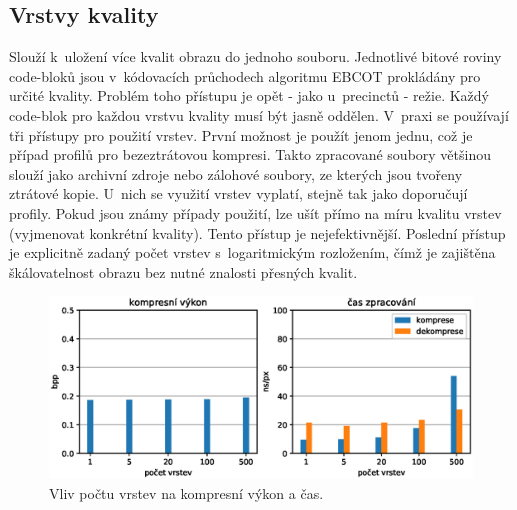\clearpage




%
%
\newpage
\subsection*{Vrstvy kvality}
Slouží k~uložení více kvalit obrazu do jednoho souboru. Jednotlivé bitové roviny code-bloků jsou v~kódovacích průchodech algoritmu EBCOT prokládány pro určité kvality. Problém toho přístupu je opět - jako u~precinctů - režie. Každý code-blok pro každou vrstvu kvality musí být jasně oddělen. V~praxi se používají tři přístupy pro použití vrstev. První možnost je použít jenom jednu, což je případ profilů pro bezeztrátovou kompresi. Takto zpracované soubory většinou slouží jako archivní zdroje nebo zálohové soubory, ze kterých jsou tvořeny ztrátové kopie. U~nich se využití vrstev vyplatí, stejně tak jako doporučují profily. Pokud jsou známy případy použití, lze ušít přímo na míru kvalitu vrstev (vyjmenovat konkrétní kvality). Tento přístup je nejefektivnější. Poslední přístup je explicitně zadaný počet vrstev s~logaritmickým rozložením, čímž je zajištěna škálovatelnost obrazu bez nutné znalosti přesných kvalit.

\begin{figure}[hbt!]
  \centering
  \hspace*{-0.75cm}
  \includegraphics[width=16cm]{obrazky-figures/layers/fotky_layers.eps}
  \caption{Vliv počtu vrstev na kompresní výkon a čas.}
\end{figure}

